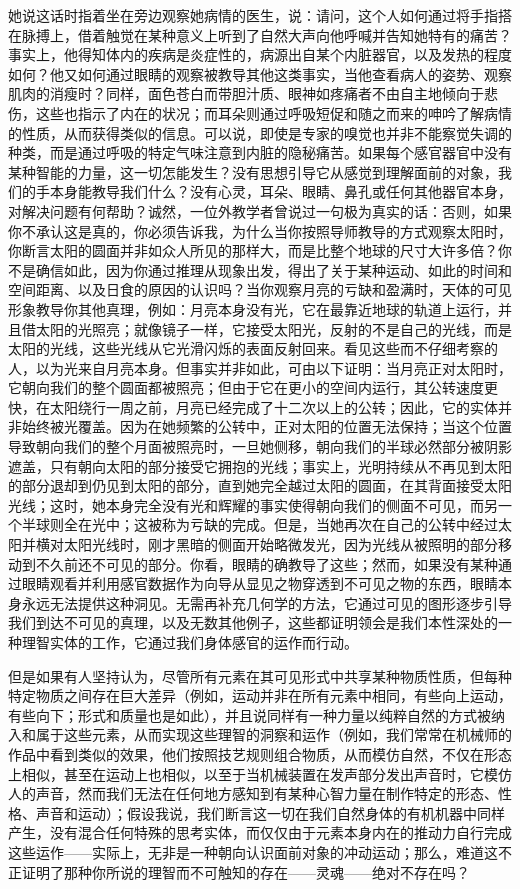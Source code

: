 她说这话时指着坐在旁边观察她病情的医生，说：请问，这个人如何通过将手指搭在脉搏上，借着触觉在某种意义上听到了自然大声向他呼喊并告知她特有的痛苦？事实上，他得知体内的疾病是炎症性的，病源出自某个内脏器官，以及发热的程度如何？他又如何通过眼睛的观察被教导其他这类事实，当他查看病人的姿势、观察肌肉的消瘦时？同样，面色苍白而带胆汁质、眼神如疼痛者不由自主地倾向于悲伤，这些也指示了内在的状况；而耳朵则通过呼吸短促和随之而来的呻吟了解病情的性质，从而获得类似的信息。可以说，即使是专家的嗅觉也并非不能察觉失调的种类，而是通过呼吸的特定气味注意到内脏的隐秘痛苦。如果每个感官器官中没有某种智能的力量，这一切怎能发生？没有思想引导它从感觉到理解面前的对象，我们的手本身能教导我们什么？没有心灵，耳朵、眼睛、鼻孔或任何其他器官本身，对解决问题有何帮助？诚然，一位外教学者曾说过一句极为真实的话：否则，如果你不承认这是真的，你必须告诉我，为什么当你按照导师教导的方式观察太阳时，你断言太阳的圆面并非如众人所见的那样大，而是比整个地球的尺寸大许多倍？你不是确信如此，因为你通过推理从现象出发，得出了关于某种运动、如此的时间和空间距离、以及日食的原因的认识吗？当你观察月亮的亏缺和盈满时，天体的可见形象教导你其他真理，例如：月亮本身没有光，它在最靠近地球的轨道上运行，并且借太阳的光照亮；就像镜子一样，它接受太阳光，反射的不是自己的光线，而是太阳的光线，这些光线从它光滑闪烁的表面反射回来。看见这些而不仔细考察的人，以为光来自月亮本身。但事实并非如此，可由以下证明：当月亮正对太阳时，它朝向我们的整个圆面都被照亮；但由于它在更小的空间内运行，其公转速度更快，在太阳绕行一周之前，月亮已经完成了十二次以上的公转；因此，它的实体并非始终被光覆盖。因为在她频繁的公转中，正对太阳的位置无法保持；当这个位置导致朝向我们的整个月面被照亮时，一旦她侧移，朝向我们的半球必然部分被阴影遮盖，只有朝向太阳的部分接受它拥抱的光线；事实上，光明持续从不再见到太阳的部分退却到仍见到太阳的部分，直到她完全越过太阳的圆面，在其背面接受太阳光线；这时，她本身完全没有光和辉耀的事实使得朝向我们的侧面不可见，而另一个半球则全在光中；这被称为亏缺的完成。但是，当她再次在自己的公转中经过太阳并横对太阳光线时，刚才黑暗的侧面开始略微发光，因为光线从被照明的部分移动到不久前还不可见的部分。你看，眼睛的确教导了这些；然而，如果没有某种通过眼睛观看并利用感官数据作为向导从显见之物穿透到不可见之物的东西，眼睛本身永远无法提供这种洞见。无需再补充几何学的方法，它通过可见的图形逐步引导我们到达不可见的真理，以及无数其他例子，这些都证明领会是我们本性深处的一种理智实体的工作，它通过我们身体感官的运作而行动。\par

但是如果有人坚持认为，尽管所有元素在其可见形式中共享某种物质性质，但每种特定物质之间存在巨大差异（例如，运动并非在所有元素中相同，有些向上运动，有些向下；形式和质量也是如此），并且说同样有一种力量以纯粹自然的方式被纳入和属于这些元素，从而实现这些理智的洞察和运作（例如，我们常常在机械师的作品中看到类似的效果，他们按照技艺规则组合物质，从而模仿自然，不仅在形态上相似，甚至在运动上也相似，以至于当机械装置在发声部分发出声音时，它模仿人的声音，然而我们无法在任何地方感知到有某种心智力量在制作特定的形态、性格、声音和运动）；假设我说，我们断言这一切在我们自然身体的有机机器中同样产生，没有混合任何特殊的思考实体，而仅仅由于元素本身内在的推动力自行完成这些运作——实际上，无非是一种朝向认识面前对象的冲动运动；那么，难道这不正证明了那种你所说的理智而不可触知的存在——灵魂——绝对不存在吗？\par

